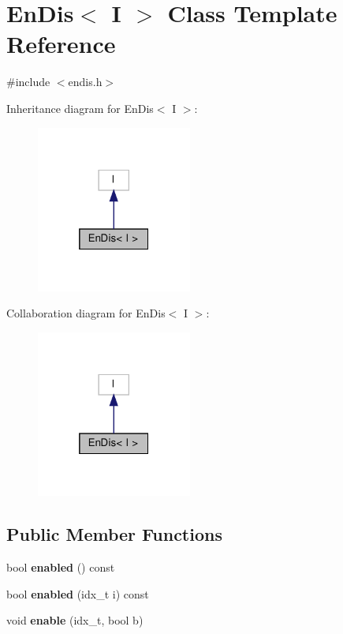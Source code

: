 \hypertarget{classEnDis}{}\section{En\+Dis$<$ I $>$ Class Template Reference}
\label{classEnDis}


{\ttfamily \#include $<$endis.\+h$>$}



Inheritance diagram for En\+Dis$<$ I $>$\+:\nopagebreak
\begin{figure}[H]
\begin{center}
\leavevmode
\includegraphics[width=145pt]{classEnDis__inherit__graph}
\end{center}
\end{figure}


Collaboration diagram for En\+Dis$<$ I $>$\+:\nopagebreak
\begin{figure}[H]
\begin{center}
\leavevmode
\includegraphics[width=145pt]{classEnDis__coll__graph}
\end{center}
\end{figure}
\subsection*{Public Member Functions}
\begin{DoxyCompactItemize}
\item 
\mbox{\label{classEnDis_a4aba794bdadbbd9991848f45018f1baa}} 
bool {\bfseries enabled} () const
\item 
\mbox{\label{classEnDis_a3c5925fb25164f1b6e1be83b2d7c4507}} 
bool {\bfseries enabled} (idx\+\_\+t i) const
\item 
\mbox{\label{classEnDis_a60b9f54dec9a197802f97fb2a7b3ddb4}} 
void {\bfseries enable} (idx\+\_\+t, bool b)
\end{DoxyCompactItemize}
